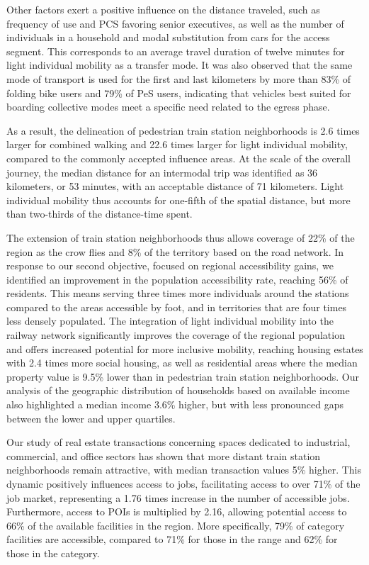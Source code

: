 \begin{refsegment}
Other factors exert a positive influence on the distance traveled, such as frequency of use and \acrshort{PCS} favoring senior executives, as well as the number of individuals in a household and modal substitution from cars for the access segment. This corresponds to an average travel duration of twelve minutes for light individual mobility as a transfer mode. It was also observed that the same mode of transport is used for the first and last kilometers by more than 83\% of folding bike users and 79\% of \acrshort{PeS} users, indicating that vehicles best suited for boarding collective modes meet a specific need related to the egress phase.%

As a result, the delineation of pedestrian train station neighborhoods is 2.6 times larger for combined walking and 22.6 times larger for light individual mobility, compared to the commonly accepted influence areas. At the scale of the overall journey, the median distance for an intermodal trip was identified as 36 kilometers, or 53 minutes, with an acceptable distance of 71 kilometers. Light individual mobility thus accounts for one-fifth of the spatial distance, but more than two-thirds of the distance-time spent.%

The extension of train station neighborhoods thus allows coverage of 22\% of the region as the crow flies and 8\% of the territory based on the road network. In response to our second objective, focused on regional accessibility gains, we identified an improvement in the population accessibility rate, reaching 56\% of residents. This means serving three times more individuals around the stations compared to the areas accessible by foot, and in territories that are four times less densely populated. The integration of light individual mobility into the railway network significantly improves the coverage of the regional population and offers increased potential for more inclusive mobility, reaching housing estates with 2.4 times more social housing, as well as residential areas where the median property value is 9.5\% lower than in pedestrian train station neighborhoods. Our analysis of the geographic distribution of households based on available income also highlighted a median income 3.6\% higher, but with less pronounced gaps between the lower and upper quartiles.%

Our study of real estate transactions concerning spaces dedicated to industrial, commercial, and office sectors has shown that more distant train station neighborhoods remain attractive, with median transaction values 5\% higher. This dynamic positively influences access to jobs, facilitating access to over 71\% of the job market, representing a 1.76 times increase in the number of accessible jobs. Furthermore, access to \acrshort{POIs} is multiplied by 2.16, allowing potential access to 66\% of the available facilities in the region. More specifically, 79\% of  category facilities are accessible, compared to 71\% for those in the  range and 62\% for those in the  category.%


\end{refsegment}
